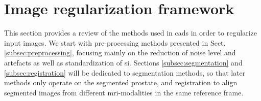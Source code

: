 \section{Image regularization framework} \label{sec:imaprocfra}

This section provides a review of the methods used in \acp{cad} in order to regularize input images. We start with pre-processing methods presented in Sect. \ref{subsec:preprocessing}, focusing mainly on the reduction of noise level and artefacts as well as standardization of \ac{si}. Sections \ref{subsec:segmentation} and \ref{subsec:registration} will be dedicated to segmentation methods, so that later methods only operate on the segmented prostate, and registration to align segmented images from different \ac{mri}-modalities in the same reference frame.







